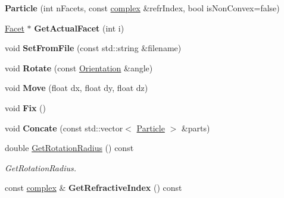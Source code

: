 \begin{DoxyCompactItemize}
\item 
\mbox{\label{class_particle_ade07dfa403a16f3a9faad7fec89d658a}} 
{\bfseries Particle} (int n\+Facets, const \mbox{\hyperlink{classcomplex}{complex}} \&refr\+Index, bool is\+Non\+Convex=false)
\item 
\mbox{\label{class_particle_a3ea99e51c15fc69406a9d4812eff7248}} 
\mbox{\hyperlink{class_facet}{Facet}} $\ast$ {\bfseries Get\+Actual\+Facet} (int i)
\item 
\mbox{\label{class_particle_a6877eea54e7fb816809dd2be6cd5acdc}} 
void {\bfseries Set\+From\+File} (const std\+::string \&filename)
\item 
\mbox{\label{class_particle_aee7a26b9ff9a26bfb554aefa9ceaf89f}} 
void {\bfseries Rotate} (const \mbox{\hyperlink{class_angle3d}{Orientation}} \&angle)
\item 
\mbox{\label{class_particle_a62328fcaf288317fa6667ee9bba90de4}} 
void {\bfseries Move} (float dx, float dy, float dz)
\item 
\mbox{\label{class_particle_a3e8f5b164ae0571114a98c2bafd15892}} 
void {\bfseries Fix} ()
\item 
\mbox{\label{class_particle_aecdc7104b12fab4e8485ef56546b4e1b}} 
void {\bfseries Concate} (const std\+::vector$<$ \mbox{\hyperlink{class_particle}{Particle}} $>$ \&parts)
\item 
double \mbox{\hyperlink{class_particle_ab06b62449ba3213e3f8bf580a910dd66}{Get\+Rotation\+Radius}} () const
\begin{DoxyCompactList}\small\item\em Get\+Rotation\+Radius. \end{DoxyCompactList}\item 
\mbox{\label{class_particle_a5883ada02784b29b5cb1851f16f48066}} 
const \mbox{\hyperlink{classcomplex}{complex}} \& {\bfseries Get\+Refractive\+Index} () const
\item 
\mbox{\label{class_particle_a9345bfffdb91b7beb9ec48c9af29141e}} 

\end{DoxyCompactItemize}
